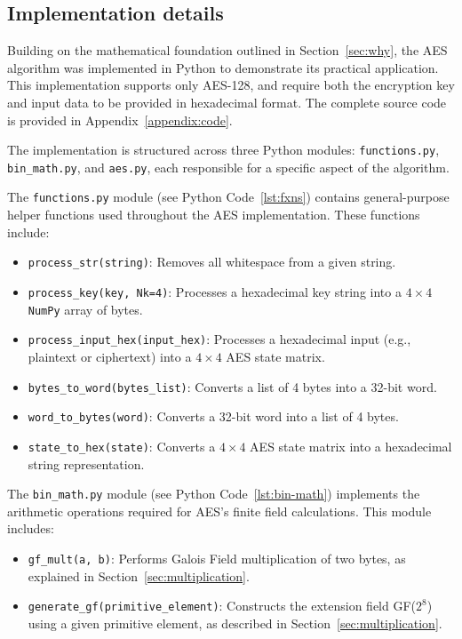 \subsection{Implementation details}

Building on the mathematical foundation outlined in Section~\ref{sec:why}, the AES algorithm was implemented in Python to demonstrate its practical application.
This implementation supports only AES-128, and require both the encryption key and input data to be provided in hexadecimal format. 
The complete source code is provided in Appendix~\ref{appendix:code}.

The implementation is structured across three Python modules: \texttt{functions.py}, \texttt{bin\_math.py}, and \texttt{aes.py}, each responsible for a specific aspect of the algorithm.

The \texttt{functions.py} module (see Python Code~\ref{lst:fxns}) contains general-purpose helper functions used throughout the AES implementation. 
These functions include:
\begin{itemize}
    \item \texttt{process\_str(string)}: Removes all whitespace from a given string.
    \item \texttt{process\_key(key, Nk=4)}: Processes a hexadecimal key string into a $4\times4$ \texttt{NumPy} array of bytes.
    \item \texttt{process\_input\_hex(input\_hex)}: Processes a hexadecimal input (e.g., plaintext or ciphertext) into a $4\times4$ AES state matrix.
    \item \texttt{bytes\_to\_word(bytes\_list)}: Converts a list of 4 bytes into a 32-bit word.
    \item \texttt{word\_to\_bytes(word)}: Converts a 32-bit word into a list of 4 bytes.
    \item \texttt{state\_to\_hex(state)}: Converts a $4\times4$ AES state matrix into a hexadecimal string representation.
\end{itemize}

The \texttt{bin\_math.py} module (see Python Code~\ref{lst:bin-math}) implements the arithmetic operations required for AES's finite field calculations. 
This module includes:
\begin{itemize}
    \item \texttt{gf\_mult(a, b)}: Performs Galois Field multiplication of two bytes, as explained in Section~\ref{sec:multiplication}.
    \item \texttt{generate\_gf(primitive\_element)}: Constructs the extension field GF($2^8$) using a given primitive element, as described in Section~\ref{sec:multiplication}.
\end{itemize}

